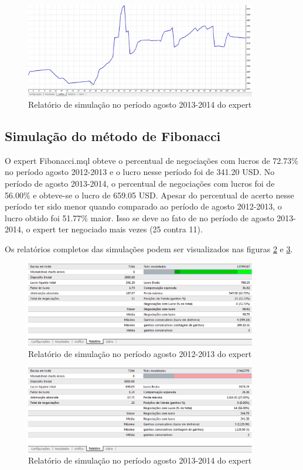 \begin{figure}[H]
\centering
\includegraphics[width=0.9\textwidth]{figuras/protocoloMinimos4}
\caption{Relatório de simulação no período agosto 2013-2014 do expert}
\label{protocoloMinimos4}
\end{figure}

\subsection{Simulação do método de Fibonacci}

O expert Fibonacci.mql obteve o percentual de negociações com lucros de 72.73\% no período agosto 2012-2013 e o  lucro nesse período foi de 341.20 USD.
No período de agosto 2013-2014, o percentual de negociações com lucros foi de 56.00\%  e obteve-se o lucro de 659.05 USD. Apesar do percentual de acerto nesse período ter sido menor quando comparado ao período de agosto 2012-2013, o lucro obtido foi 51.77\% maior. Isso se deve ao fato de no período de agosto 2013-2014, o expert ter negociado mais vezes (25 contra 11).

Os relatórios completos das simulações podem ser visualizados nas figuras \ref{protocoloFib} e \ref{protocoloFib2}.

\begin{figure}[H]
\centering
\includegraphics[width=0.9\textwidth]{figuras/protocoloFib}
\caption{Relatório de simulação no período agosto 2012-2013 do expert}
\label{protocoloFib}
\end{figure}

\begin{figure}[H]
\centering
\includegraphics[width=0.9\textwidth]{figuras/protocoloFib2}
\caption{Relatório de simulação no período agosto 2013-2014 do expert}
\label{protocoloFib2}
\end{figure}

